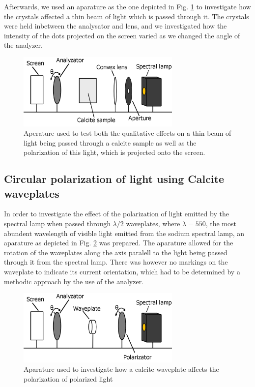 \documentclass[%
 reprint,
 amsmath,amssymb,
 aps,
]{revtex4-1}
\begin{document}
    Afterwards, we used an aparature as the one depicted in Fig. \ref{fig:calcite} to investigate how the crystals affected a thin beam of light which is passed through it. The crystals were held inbetween the analysator and lens, and we investigated how the intensity of the dots projected on the screen varied as we changed the angle of the analyzer.

    \begin{figure}[h!]
      \center
      \includegraphics[width=8cm]{scripts/figs/diagram_5.png}
      \caption{Aperature used to test both the qualitative effects on a thin beam of light being passed through a calcite sample as well as the polarization of this light, which is projected onto the screen.}
      \label{fig:calcite}
    \end{figure}

  \subsection{Circular polarization of light using Calcite waveplates}
    In order to investigate the effect of the polarization of light emitted by the spectral lamp when passed through $\lambda /2$ waveplates, where $\lambda=550$, the most abundent wavelength of visible light emitted from the sodium spectral lamp, an aparature as depicted in Fig. \ref{fig:waveplate} was prepared. The aparature allowed for the rotation of the waveplates along the axis paralell to the light being passed through it from the spectral lamp. There was however no markings on the waveplate to indicate its current orientation, which had to be determined by a methodic approach by the use of the analyzer.

    \begin{figure}[h!]
      \center
      \includegraphics[width=8cm]{scripts/figs/diagram_6.png}
      \caption{Aparature used to investigate how a calcite waveplate affects the polarization of polarized light}
      \label{fig:waveplate}
    \end{figure}
\end{document}
